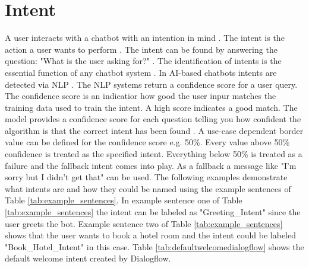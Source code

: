 \section{Intent} \label{sec:intent}
A user interacts with a chatbot with an intention in mind \cite{buiildChatbotsPython, singhbuilding}.
The intent is the action a user wants to perform \cite{dutta2017developing, rahman2017programming}.
The intent can be found by answering the question: "What is the user asking for?" \cite{buiildChatbotsPython}.
The identification of intents is the essential function of any chatbot system \cite{singhbuilding}.
In AI-based chatbots intents are detected via NLP \cite{singhbuilding}. 
The NLP systems return a confidence score for a user query.
The confidence score is an indicatior how good the user inpur matches the training data used to train the intent.
A high score indicates a good match.
The model provides a confidence score for each question telling you how 
confident the algorithm is that the correct intent has been found \cite{buiildChatbotsPython}.
A use-case dependent border value can be defined for the confidence score e.g. 50\%. 
Every value above 50\% confidence is treated as the specified intent.
Everything below 50\% is treated as a failure and the fallback intent comes into play.
As a fallback a message like "I'm sorry but I didn't get that" can be used.
The following examples demonstrate what intents are and how they could be named using the
example sentences of Table \ref{tab:example_sentences}.
In example sentence one of Table \ref{tab:example_sentences} the intent can be labeled as 
"Greeting\_Intent" since the user greets the bot.
Example sentence two of Table \ref{tab:example_sentences} shows that the user wants to book
a hotel room and the intent could be labeled "Book\_Hotel\_Intent" in this case.
Table \ref{tab:defaultwelcomedialogflow} shows the default welcome intent created by Dialogflow. 

